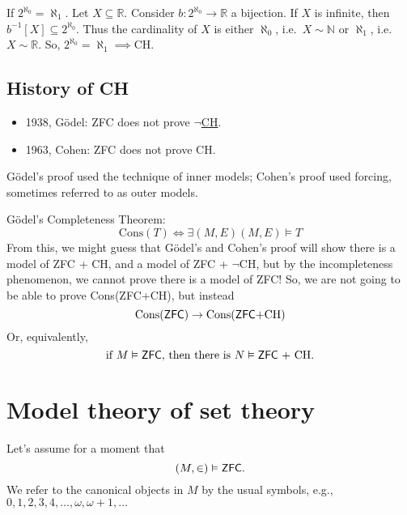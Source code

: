 \documentclass{article}
\newcommand{\1}{\mathbbm{1}}
\let\models\vDash
\begin{document}
If $2^{\aleph_0} = \aleph_1$.
Let $X \subseteq \mathbb{R}$. Consider $b: 2^{\aleph_0} \to \mathbb{R}$ a bijection. If $X$ is infinite, then $b^{-1}[X] \subseteq 2^{\aleph_0}$.
Thus the cardinality of $X$ is either $\aleph_0$, i.e.\ $X \sim \mathbb{N}$ or $\aleph_1$, i.e.\ $X \sim \mathbb{R}$.
So, $2^{\aleph_0} = \aleph_1 \implies \text{CH}$.

\subsection{History of CH}
\begin{itemize}[label=--]
  \item 1938, G\"odel: \textsf{ZFC} does not prove $\neg$\hyperlink{def:ch}{CH}.
  \item 1963, Cohen: \textsf{ZFC} does not prove CH.
\end{itemize}
G\"odel's proof used the technique of inner models; Cohen's proof used forcing, sometimes referred to as outer models.

G\"odel's Completeness Theorem:
\begin{equation*}
  \text{Cons}(T) \iff \exists(M, E) (M, E) \models T
\end{equation*}
From this, we might guess that G\"odel's and Cohen's proof will show there is a model of \textsf{ZFC} + CH, and a model of \textsf{ZFC} + $\neg$CH, but by the incompleteness phenomenon, we cannot prove there is a model of \textsf{ZFC}!
So, we are not going to be able to prove Cons(\textsf{ZFC}+CH), but instead
\begin{equation*}
  \text{Cons(\textsf{ZFC})} \rightarrow \text{Cons(\textsf{ZFC}+CH)}
\end{equation*}
Or, equivalently,
\begin{equation*}
  \text{if } M \models \text{\textsf{ZFC}, then there is } N \models \text{\textsf{ZFC} + CH}.
\end{equation*}

\clearpage
\section{Model theory of set theory}
Let's assume for a moment that
\begin{equation*}
  (M,\in) \models \text{\textsf{ZFC}}.
\end{equation*}
We refer to the canonical objects in $M$ by the usual symbols, e.g., $0,1,2,3,4,\dotsc, \omega, \omega+1, \dotsc$
\end{document}
